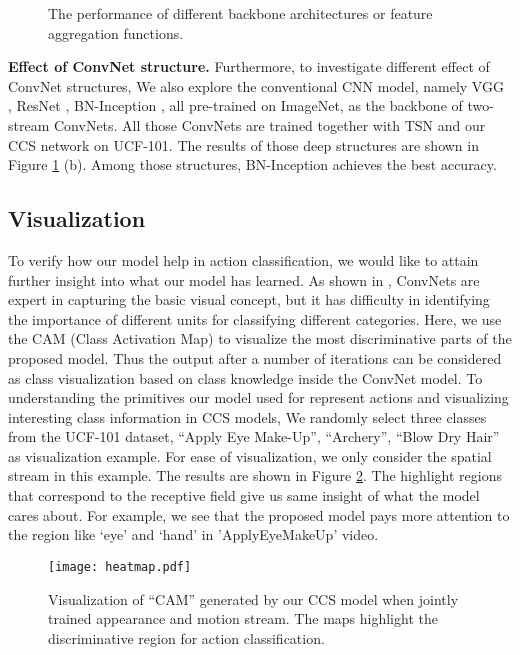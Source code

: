 \documentclass[conference,compsoc]{IEEEtran}
\begin{document}
    \begin{figure}
    \centering
    \hfil
    \caption{The performance of different backbone architectures or feature aggregation functions.}
    \label{fig:arc_agg}
    \end{figure}


\noindent\textbf{Effect of ConvNet structure. } Furthermore, to investigate different effect of ConvNet structures, We also explore the conventional CNN model, namely VGG \cite{simonyan2014very}, ResNet \cite{he2016deep}, BN-Inception \cite{ioffe2015batch}, all pre-trained on ImageNet, as the backbone of two-stream ConvNets. All those ConvNets are trained together with TSN and our CCS network on UCF-101. The results of those deep structures are shown in Figure \ref{fig:arc_agg} (b). Among those structures, BN-Inception achieves the best accuracy.

\subsection{Visualization}
To verify how our model help in action classification, we would like to attain further insight into what our model has learned. As shown in \cite{zhou2016learning},  ConvNets are expert in capturing the basic visual concept, but it has difficulty in identifying the importance of different units for classifying different categories. Here, we use the CAM (Class Activation Map) \cite{zhou2016learning} to visualize the most discriminative parts of the proposed model. Thus the output after a number of iterations can be considered as class visualization based on class knowledge inside the ConvNet model. To understanding the primitives our model used for represent actions and visualizing interesting class information in CCS models, We randomly select three classes from the UCF-101 dataset, ``Apply Eye Make-Up'', ``Archery'', ``Blow Dry Hair'' as visualization example. For ease of visualization, we only consider the spatial stream in this example. The results are shown in Figure \ref{fig:cam}. The highlight regions that correspond to the receptive field give us same insight of what the model cares about. For example, we see that the proposed model pays more attention to the region like `eye' and `hand' in 'ApplyEyeMakeUp' video.

\begin{figure}[h]
    \centering
    \texttt{[image: heatmap.pdf]}
    \caption{Visualization of ``CAM'' \cite{zhou2016learning} generated by our CCS model when jointly trained appearance and motion stream. The maps highlight the discriminative region for action classification.}
    \label{fig:cam}
\end{figure}
\end{document}
